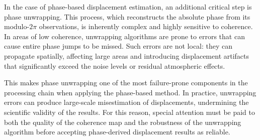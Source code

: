 In the case of phase-based displacement estimation, an additional critical step is phase unwrapping. This process, which reconstructs the absolute phase from its modulo-\(2\pi\) observations, is inherently complex and highly sensitive to coherence. In areas of low coherence, unwrapping algorithms are prone to errors that can cause entire phase jumps to be missed. Such errors are not local: they can propagate spatially, affecting large areas and introducing displacement artifacts that significantly exceed the noise levels or residual atmospheric effects.

This makes phase unwrapping one of the most failure-prone components in the processing chain when applying the phase-based method. In practice, unwrapping errors can produce large-scale misestimation of displacements, undermining the scientific validity of the results. For this reason, special attention must be paid to both the quality of the coherence map and the robustness of the unwrapping algorithm before accepting phase-derived displacement results as reliable.